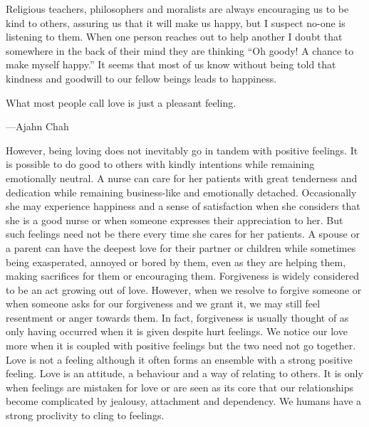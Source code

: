 \documentclass[10pt, openright]{book}
\newenvironment{epigram-2}%
{%
\setstretch{1.4}
\vspace{1em}
\noindent
\quoting[leftmargin=2cm,rightmargin=2cm]%
\begin{itshape}
\large
}%
{\end{itshape}\endquoting
}%
\newenvironment{epigram-2-cite}%
{%
\quoting[leftmargin=2cm,rightmargin=2cm]%
\noindent\normal\hspace*{\fill} 
}%
{\endquoting
}%
\begin{document}
Religious teachers, philosophers and moralists are always encouraging us to be kind to others, assuring us that it will make us happy, but I suspect no-one is listening to them. When one person reaches out to help another I doubt that somewhere in the back of their mind they are thinking “Oh goody! A chance to make myself happy.” It seems that most of us know without being told that kindness and goodwill to our fellow beings leads to happiness.


\begin{epigram-2}
What most people call love is just a pleasant feeling.
\end{epigram-2}
\begin{epigram-2-cite}
—Ajahn Chah
\end{epigram-2-cite}

However, being loving does not inevitably go in tandem with positive feelings. It is possible to do good to others with kindly intentions while remaining emotionally neutral. A nurse can care for her patients with great tenderness and dedication while remaining business-like and emotionally detached. Occasionally she may experience happiness and a sense of satisfaction when she considers that she is a good nurse or when someone expresses their appreciation to her. But such feelings need not be there every time she cares for her patients. A spouse or a parent can have the deepest love for their partner or children while sometimes being exasperated, annoyed or bored by them, even as they are helping them, making sacrifices for them or encouraging them. Forgiveness is widely considered to be an act growing out of love. However, when we resolve to forgive someone or when someone asks for our forgiveness and we grant it, we may still feel resentment or anger towards them. In fact, forgiveness is usually thought of as only having occurred when it is given despite hurt feelings. We notice our love more when it is coupled with positive feelings but the two need not go together. Love is not a feeling although it often forms an ensemble with a strong positive feeling. Love is an attitude, a behaviour and a way of relating to others. It is only when feelings are mistaken for love or are seen as its core that our relationships become complicated by jealousy, attachment and dependency. We humans have a strong proclivity to cling to feelings.
\end{document}
